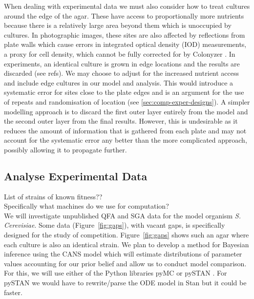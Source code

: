 When dealing with experimental data we must also consider how to treat
cultures around the edge of the agar. These have access to
proportionally more nutrients because there is a relatively large area
beyond them which is unoccupied by cultures. In photographic images,
these sites are also affected by reflections from plate walls which
cause errors in integrated optical density (IOD) measurements, a proxy
for cell density, which cannot be fully corrected for by Colonyzer
\citep{Lawless2010}. In experiments, an identical culture is grown in
edge locations and the results are discarded (see refs). We may choose
to adjust for the increased nutrient access and include edge cultures
in our model and analysis. This would introduce a systematic error for
sites close to the plate edges and is an argument for the use of
repeats and randomisation of location (see
\ref{sec:comp-exper-designs}). A simpler modelling approach is to
discard the first outer layer entirely from the model and the second
outer layer from the final results. However, this is undesirable as it
reduces the amount of information that is gathered from each plate and
may not account for the systematic error any better than the more
complicated approach, possibly allowing it to propagate further.

\subsection{Analyse Experimental Data}
\label{sec:analyse-data}

List of strains of known fitness??\\
Specifically what machines do we use for computation?\\

We will investigate unpublished QFA and SGA data for the model
organism \textit{S. Cerevisiae}. Some data (Figure~\ref{fig:gaps}),
with vacant gaps, is specifically designed for the study of
competition. Figure~\ref{fig:gaps} shows such an agar where each
culture is also an identical strain. We plan to develop a method for
Bayesian inference using the CANS model which will estimate
distributions of parameter values accounting for our prior belief and
allow us to conduct model comparison. For this, we will use either of
the Python libraries pyMC \citep{PyMC2010} or pySTAN \citep{Stan}. For
pySTAN we would have to rewrite/parse the ODE model in Stan but it
could be faster.

